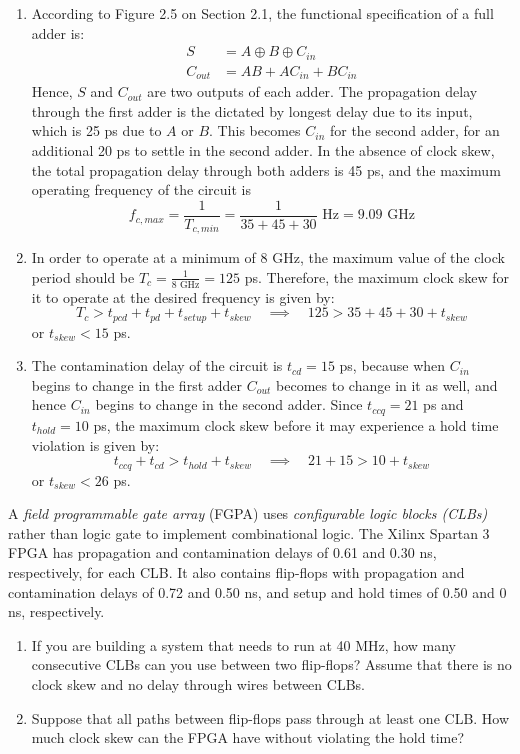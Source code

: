 \documentclass[12pt]{article}
\newenvironment{ex}[2][Exercise]{\begin{trivlist}
		\item[\hskip \labelsep {\bfseries #1}\hskip \labelsep {\bfseries #2.}]}{\end{trivlist}}
\newenvironment{sol}[1][Solution]{\begin{trivlist}
		\item[\hskip \labelsep {\bfseries #1:}]}{\end{trivlist}}
\begin{document}
\begin{sol}
	\begin{enumerate}[label=(\alph*)]
		\item According to Figure 2.5 on Section 2.1, the functional specification of
		a full adder is:
		\begin{align*}
			S&=A\oplus B\oplus C_{in}\\
			C_{out}&=AB+AC_{in}+BC_{in}
		\end{align*}
		Hence, $S$ and $C_{out}$ are two outputs of each adder. The propagation
		delay through the first adder is the dictated by longest delay due to its
		input, which is 25 ps due to $A$ or $B$. This becomes
		$C_{in}$ for the second adder, for an additional 20 ps to settle in the second
		adder. In the absence of clock skew, the total propagation delay
		through both adders is 45 ps, and the maximum operating frequency of the circuit
		is
		\[
		f_{c, max}=\frac{1}{T_{c, min}}=
			\frac{1}{35+45+30}\text{ Hz}=9.09\text{ GHz}
		\]
		\item In order to operate at a minimum of 8 GHz, the maximum value of the clock
		period should be $T_{c}=\frac{1}{8\text{ GHz}}=125$ ps. Therefore, the
		maximum clock skew for it to operate at the desired frequency is given by:
		\[
		T_{c}> t_{pcd}+t_{pd}+t_{setup}+t_{skew}\quad\implies\quad 125> 35+45+30+t_{skew}
		\]
		or $t_{skew}< 15$ ps.
		\item The contamination delay of the circuit is $t_{cd}=15$ ps, because
		when $C_{in}$ begins to change in the first adder $C_{out}$ becomes to
		change in it as well, and hence $C_{in}$ begins to change in the second adder.
		Since $t_{ccq}=21$ ps and $t_{hold}=10$ ps, the maximum clock
		skew before it may experience a hold time violation is given by:
		\[
		t_{ccq}+t_{cd}> t_{hold}+t_{skew}\quad\implies\quad 21+15>10+t_{skew}
		\]
		or $t_{skew}<26$ ps.
	\end{enumerate}
\end{sol}

\begin{ex}{3.35}
	A \emph{field programmable gate array} (FGPA) uses \emph{configurable logic blocks (CLBs)}
	rather than logic gate to implement combinational logic. The Xilinx Spartan 3 FPGA
	has propagation and contamination delays of 0.61 and 0.30 ns, respectively, for each
	CLB. It also contains flip-flops with propagation and contamination delays of 0.72
	and 0.50 ns, and setup and hold times of 0.50 and 0 ns, respectively.
	\begin{enumerate}[label=(\alph*)]
		\item If you are building a system that needs to run at 40 MHz, how many
		consecutive CLBs can you use between two flip-flops? Assume that
		there is no clock skew and no delay through wires between CLBs.
		\item Suppose that all paths between flip-flops
		pass through at least one CLB. How much clock skew can the FPGA have
		without violating the hold time?
	\end{enumerate}
\end{ex}
\end{document}
